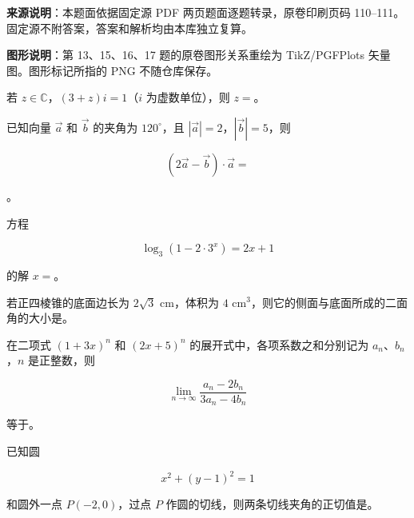 


\begin{gktip}
\textbf{来源说明}：本题面依据固定源 PDF 两页题面逐题转录，原卷印刷页码 110–111。固定源不附答案，答案和解析均由本库独立复算。

\textbf{图形说明}：第 13、15、16、17 题的原卷图形关系重绘为 TikZ/PGFPlots 矢量图。图形标记所指的 PNG 不随仓库保存。
\end{gktip}


\begin{question}
若 $z\in\mathbb C$，$(3+z)i=1$（$i$ 为虚数单位），则 $z=$\gkblank{}。

\end{question}
\begin{question}
已知向量 $\vec a$ 和 $\vec b$ 的夹角为 $120^\circ$，且 $|\vec a|=2$，$|\vec b|=5$，则

\nopagebreak[4]
\[
(2\vec a-\vec b)\cdot\vec a=
\]

\gkblank{}。

\end{question}
\begin{question}
方程

\nopagebreak[4]
\[
\log_3(1-2\cdot3^x)=2x+1
\]

的解 $x=$\gkblank{}。

\end{question}
\begin{question}
若正四棱锥的底面边长为 $2\sqrt3\text{ cm}$，体积为 $4\text{ cm}^3$，则它的侧面与底面所成的二面角的大小是\gkblank{}。

\end{question}
\begin{question}
在二项式 $(1+3x)^n$ 和 $(2x+5)^n$ 的展开式中，各项系数之和分别记为 $a_n\text{、}b_n$，$n$ 是正整数，则

\nopagebreak[4]
\[
\lim_{n\to\infty}\frac{a_n-2b_n}{3a_n-4b_n}
\]

等于\gkblank{}。

\end{question}
\begin{question}
已知圆

\nopagebreak[4]
\[
x^2+(y-1)^2=1
\]

和圆外一点 $P(-2,0)$，过点 $P$ 作圆的切线，则两条切线夹角的正切值是\gkblank{}。

\end{question}

